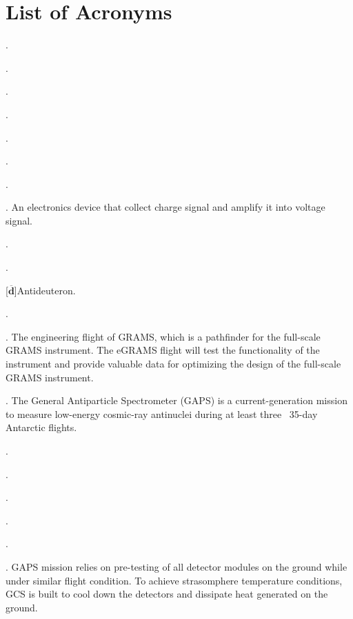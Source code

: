 
\chapter*{List of Acronyms}


\begin{acronym}

.

.

. 

.

.

. 

.

.
    An electronics device that collect charge signal and amplify it into voltage signal.

.

.

[$\mathbf{\overline{d}}$]{Antideuteron}.

.

.
    The engineering flight of GRAMS, which is a pathfinder for the full-scale GRAMS instrument. The eGRAMS flight will test the functionality of the instrument and provide valuable data for optimizing the design of the full-scale GRAMS instrument.

.
	The General Antiparticle Spectrometer (GAPS) is a current-generation mission to measure low-energy cosmic-ray antinuclei during at least three ~35-day Antarctic flights.

.

.

.

.

.

.
    GAPS mission relies on pre-testing of all detector modules on the ground while under similar flight condition. To achieve strasomphere temperature conditions, GCS is built to cool down the detectors and dissipate heat generated on the ground.
    

\end{acronym}
